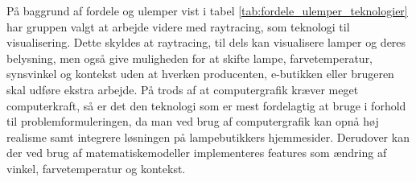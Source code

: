 På baggrund af fordele og ulemper vist i tabel \ref{tab:fordele_ulemper_teknologier} har gruppen valgt at arbejde videre med raytracing, som teknologi til visualisering. Dette skyldes at raytracing, til dels kan visualisere lamper og deres belysning, men også give muligheden for at skifte lampe,  farvetemperatur, synsvinkel og kontekst uden at hverken producenten, e-butikken eller brugeren skal udføre ekstra arbejde. På trods af at computergrafik kræver meget computerkraft, så er det den teknologi som er mest fordelagtig at bruge i forhold til problemformuleringen, da man ved brug af computergrafik kan opnå høj realisme samt integrere løsningen på lampebutikkers hjemmesider. Derudover kan der ved brug af matematiskemodeller implementeres features som ændring af vinkel, farvetemperatur og kontekst. 

\clearpage

